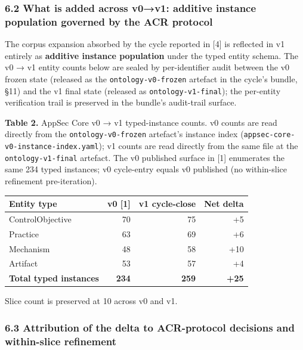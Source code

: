 \documentclass[
]{article}
\begin{document}
\subsubsection{6.2 What is added across v0→v1: additive instance
population governed by the ACR
protocol}\label{what-is-added-across-v0v1-additive-instance-population-governed-by-the-acr-protocol}

The corpus expansion absorbed by the cycle reported in {[}4{]} is
reflected in v1 entirely as \textbf{additive instance population} under
the typed entity schema. The v0 → v1 entity counts below are sealed by
per-identifier audit between the v0 frozen state (released as the
\texttt{ontology-v0-frozen} artefact in the cycle's bundle, §11) and the
v1 final state (released as \texttt{ontology-v1-final}); the per-entity
verification trail is preserved in the bundle's audit-trail surface.

\textbf{Table 2.} AppSec Core v0 → v1 typed-instance counts. v0 counts
are read directly from the \texttt{ontology-v0-frozen} artefact's
instance index (\texttt{appsec-core-v0-instance-index.yaml}); v1 counts
are read directly from the same file at the \texttt{ontology-v1-final}
artefact. The v0 published surface in {[}1{]} enumerates the same 234
typed instances; v0 cycle-entry equals v0 published (no within-slice
refinement pre-iteration).

\begin{longtable}[]{@{}lrrr@{}}
\toprule\noalign{}
Entity type & v0 {[}1{]} & v1 cycle-close & Net delta \\
\midrule\noalign{}
\endhead
\bottomrule\noalign{}
\endlastfoot
ControlObjective & 70 & 75 & +5 \\
Practice & 63 & 69 & +6 \\
Mechanism & 48 & 58 & +10 \\
Artifact & 53 & 57 & +4 \\
\textbf{Total typed instances} & \textbf{234} & \textbf{259} &
\textbf{+25} \\
\end{longtable}

Slice count is preserved at 10 across v0 and v1.

\subsubsection{6.3 Attribution of the delta to ACR-protocol decisions
and within-slice
refinement}\label{attribution-of-the-delta-to-acr-protocol-decisions-and-within-slice-refinement}
\end{document}
